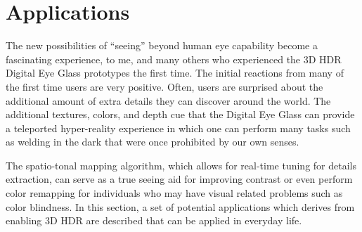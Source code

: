 


\section{Applications}
The new possibilities of ``seeing'' beyond human eye capability become a fascinating experience, to 
me, and many others who experienced the 3D HDR Digital Eye Glass prototypes the first time. The 
initial reactions from many of the first time users are very positive. Often, users are surprised about 
the additional amount of extra details they can discover around the world. The additional textures, 
colors, and depth cue that the Digital Eye Glass can provide a teleported hyper-reality experience in 
which one can perform many tasks such as welding in the dark that were once prohibited by our own 
senses. 

The spatio-tonal mapping algorithm, which allows for real-time tuning for details extraction, can serve 
as a true seeing aid for improving contrast or even perform color remapping for individuals who may 
have visual related problems such as color blindness. In this section, a set of potential applications 
which derives from enabling 3D HDR are described that can be applied in everyday life.

